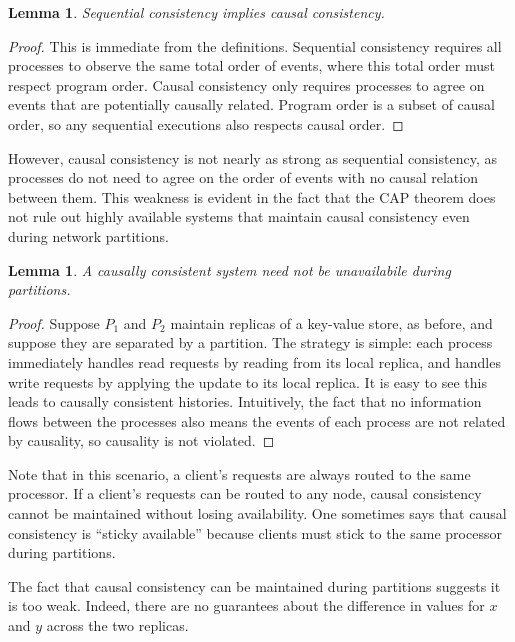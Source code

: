 \documentclass[]             %
{NASA}                       %
\newtheorem{lemma}[theorem]{Lemma}
\theoremstyle{definition}
\begin{document}
\begin{lemma}
  Sequential consistency implies causal consistency.
\end{lemma}
\begin{proof}
  This is immediate from the definitions. Sequential consistency
  requires all processes to observe the same total order of events,
  where this total order must respect program order. Causal consistency
  only requires processes to agree on events that are potentially
  causally related. Program order is a subset of causal order, so any
  sequential executions also respects causal order.
\end{proof}

However, causal consistency is not nearly as strong as sequential
consistency, as processes do not need to agree on the order of events
with no causal relation between them. This weakness is evident in the
fact that the CAP theorem does not rule out highly available systems
that maintain causal consistency even during network partitions.

\begin{lemma}
  A causally consistent system need not be unavailabile during partitions.
\end{lemma}
\begin{proof}

  Suppose $P_1$ and $P_2$ maintain replicas of a key-value store, as
  before, and suppose they are separated by a partition. The strategy is
  simple: each process immediately handles read requests by reading from
  its local replica, and handles write requests by applying the update
  to its local replica. It is easy to see this leads to causally
  consistent histories. Intuitively, the fact that no information flows
  between the processes also means the events of each process are not
  related by causality, so causality is not violated.  \end{proof}

Note that in this scenario, a client's requests are always routed to the
same processor. If a client's requests can be routed to any node, causal
consistency cannot be maintained without losing availability. One
sometimes says that causal consistency is ``sticky available'' because
clients must stick to the same processor during partitions.

The fact that causal consistency can be maintained during partitions
suggests it is too weak. Indeed, there are no guarantees about the
difference in values for \(x\) and \(y\) across the two replicas.
\end{document}
